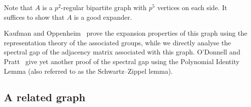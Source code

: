 \documentclass[11pt]{article}
\begin{document}
Note that $A$ is %
a  %
$p^2$-regular bipartite graph with  $p^5$ vertices on each side.
It suffices to show that $A$ is a good expander. 


Kaufman and Oppenheim~\cite{KaufmanO2018} prove the expansion
properties of this graph using
the  %
representation theory of the associated
groups, while we directly analyse the spectral gap of the adjacency
matrix associated with this graph. O'Donnell and Pratt~\cite[Case 2 in
the Proof of Theorem 3.23]{ODonnellP2022} give yet another proof of the 
spectral gap using the Polynomial Identity Lemma (also referred to as 
the Schwartz--Zippel lemma). 


\subsection{A related graph}
\end{document}
